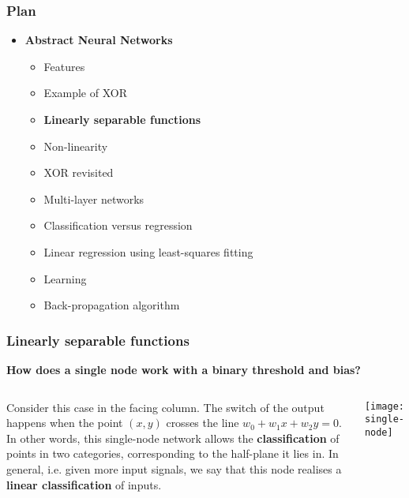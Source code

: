 %
\begin{frame}
\frametitle{Plan}

\begin{itemize}

  \item \textbf{Abstract Neural Networks}

  \begin{itemize}

    \item Features

    \item Example of XOR

    \item \textbf{Linearly separable functions}

    \item Non-linearity

    \item XOR revisited

    \item Multi-layer networks

    \item Classification versus regression

    \item Linear regression using least-squares fitting

    \item Learning

    \item Back-propagation algorithm

  \end{itemize}

\end{itemize}

\end{frame}

%
\begin{frame}
\frametitle{Linearly separable functions}
\label{linearity}

\textbf{How does a single node work with a binary threshold and bias?}

\bigskip

\begin{columns}[c]

   Consider this case in the facing column. The
  switch of the output happens when the point \((x,y)\) crosses the
  line \(w_0 + w_1 x + w_2 y = 0\). In other words, this single-node
  network allows the \textbf{classification} of points in two
  categories, corresponding to the half-plane it lies in. In general,
  i.e. given more input signals, we say that this node realises a
  \textbf{linear classification} of inputs.

  \begin{center}
    \texttt{[image: single-node]}
  \end{center}

\end{columns}

\end{frame}

